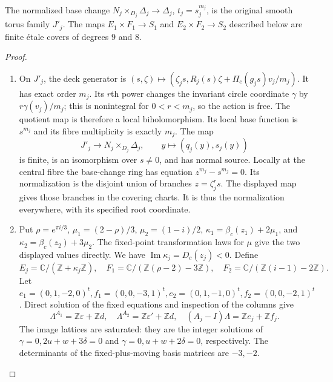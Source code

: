 \begin{proposition}\hypertarget{tag-01Q0}{}\label{fam:src:A.1.2}\label{fam:st:A.1.2}

The normalized base change $N_j\times_{D_j}\Delta_j\to\Delta_j$, $t_j=s_j^{m_j}$, is the original smooth torus family $J'_j$. The maps $E_1\times F_1\to S_1$ and $E_2\times F_2\to S_2$ described below are finite \'etale covers of degrees $9$ and $8$.
\end{proposition}


\begin{proof}
\begin{enumerate}[label=\arabic*.,leftmargin=*]
\item On $J'_j$, the deck generator is
$(s,\zeta)\mapsto(\zeta_js,R_j(s)\zeta+\Pi_c(g_js)v_j/m_j)$. It has exact order $m_j$. Its $r$th power changes the invariant circle coordinate $\gamma$ by $r\gamma(v_j)/m_j$; this is nonintegral for $0<r<m_j$, so the action is free. The quotient map is therefore a local biholomorphism. Its local base function is $s^{m_j}$ and its fibre multiplicity is exactly $m_j$. The map
\[
 J'_j\longrightarrow N_j\times_{D_j}\Delta_j,\qquad y\longmapsto(q_j(y),s_j(y))
\]
is finite, is an isomorphism over $s\ne0$, and has normal source. Locally at the central fibre the base-change ring has equation $z^{m_j}-s^{m_j}=0$. Its normalization is the disjoint union of branches $z=\zeta_j^rs$. The displayed map gives those branches in the covering charts. It is thus the normalization everywhere, with its specified root coordinate.

\item Put $\rho=e^{\pi i/3}$, $\mu_1=(2-\rho)/3$, $\mu_2=(1-i)/2$, $\kappa_1=\beta_c(z_1)+2\mu_1$, and $\kappa_2=\beta_c(z_2)+3\mu_2$. The fixed-point transformation laws for $\mu$ give the two displayed values directly. We have $\operatorname{Im}\kappa_j=D_c(z_j)<0$. Define
\[
 E_j=\mathbb C/(\mathbb Z+\kappa_j\mathbb Z),\quad
 F_1=\mathbb C/(\mathbb Z(\rho-2)-3\mathbb Z),\quad
 F_2=\mathbb C/(\mathbb Z(i-1)-2\mathbb Z).
\]
Let $e_1=(0,1,-2,0)^t,f_1=(0,0,-3,1)^t,e_2=(0,1,-1,0)^t,f_2=(0,0,-2,1)^t$. Direct solution of the fixed equations and inspection of the columns give
\[
 \Lambda^{A_1}=\mathbb Z\varepsilon+\mathbb Zd,\quad
 \Lambda^{A_2}=\mathbb Z\varepsilon'+\mathbb Zd,\quad
 (A_j-I)\Lambda=\mathbb Ze_j+\mathbb Zf_j.
\]
The image lattices are saturated: they are the integer solutions of $\gamma=0,2u+w+3\delta=0$ and $\gamma=0,u+w+2\delta=0$, respectively. The determinants of the fixed-plus-moving basis matrices are $-3,-2$.


\end{enumerate}
\end{proof}
